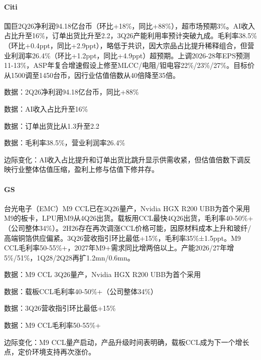 \documentclass[11pt]{ctexart}
\begin{document}
\paragraph{Citi} 国巨2Q26净利润94.18亿台币（环比+18\%，同比+88\%），超市场预期3\%。AI收入占比升至16\%，订单出货比升至2.2，3Q26产能利用率预计突破九成。毛利率38.5\%（环比+0.4ppt，同比+2.9ppt），略低于共识，因大宗品占比提升稀释组合，但营业利润率26.4\%（环比+1.2ppt，同比+4.9ppt）超预期。上调2026-28年EPS预测11-13\%，ASP年复合增速假设上修至MLCC/电阻/钽电容22\%/23\%/27\%。目标价从1500调至1450台币，因行业估值倍数从40倍降至35倍。
{\small\color{refgray}数据：2Q26净利润94.18亿台币，同比+88\%\par}
{\small\color{refgray}数据：AI收入占比升至16\%\par}
{\small\color{refgray}数据：订单出货比从1.3升至2.2\par}
{\small\color{refgray}数据：毛利率38.5\%，营业利润率26.4\%\par}
{\small\color{refgray}边际变化：AI收入占比提升和订单出货比跳升显示供需收紧，但估值倍数下调反映行业整体估值压缩，盈利上修与估值下修并存。\par}
\paragraph{GS} 台光电子（EMC）M9 CCL已在3Q26量产，Nvidia HGX R200 UBB为首个采用M9的板卡，LPU用M9从4Q26出货。载板用CCL最快4Q26出货，毛利率40-50\%+（公司整体34\%）。2H26存在再次调涨CCL价格可能，因原材料成本上升和玻纤/高端铜箔供应偏紧。3Q26营收指引环比最低+15\%，毛利率35\%±1.5ppt。M9 CCL毛利率50-55\%+，2027年M9+需求同比增两倍以上。产能2026/27年增5\%/51\%，1Q28/2Q28再扩1.2mn/0.6mn。
{\small\color{refgray}数据：M9 CCL 3Q26量产，Nvidia HGX R200 UBB为首个采用\par}
{\small\color{refgray}数据：载板CCL毛利率40-50\%+（公司整体34\%）\par}
{\small\color{refgray}数据：3Q26营收指引环比最低+15\%\par}
{\small\color{refgray}数据：M9 CCL毛利率50-55\%+\par}
{\small\color{refgray}边际变化：M9 CCL量产启动，产品升级时间表明确，载板CCL成为下一个增长点，定价环境支持再次涨价。\par}
\end{document}
